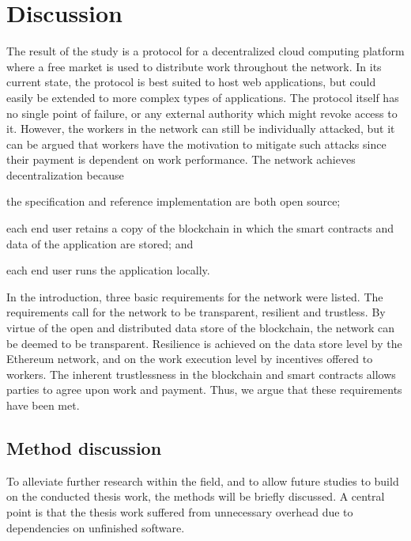 \chapter{Discussion}
The result of the study is a protocol for a decentralized cloud computing platform where a free market is used to distribute work throughout the network. In its current state, the protocol is best suited to host web applications, but could easily be extended to more complex types of applications. The protocol itself has no single point of failure, or any external authority which might revoke access to it. However, the workers in the network can still be individually attacked, but it can be argued that workers have the motivation to mitigate such attacks since their payment is dependent on work performance.
The network achieves decentralization because
\begin{inparaenum}
\item the specification and reference implementation are both open source;
\item each end user retains a copy of the blockchain in which the smart contracts and data of the application are stored; and
\item each end user runs the application locally. 
\end{inparaenum}

In the introduction, three basic requirements for the network were listed. The requirements call for the network to be transparent, resilient and trustless. By virtue of the open and distributed data store of the blockchain, the network can be deemed to be transparent. Resilience is achieved on the data store level by the Ethereum network, and on the work execution level by incentives offered to workers. The inherent trustlessness in the blockchain and smart contracts allows parties to agree upon work and payment. Thus, we argue that these requirements have been met.

\section{Method discussion}
To alleviate further research within the field, and to allow future studies to build on the conducted thesis work, the methods will be briefly discussed. A central point is that the thesis work suffered from unnecessary overhead due to dependencies on unfinished software.


